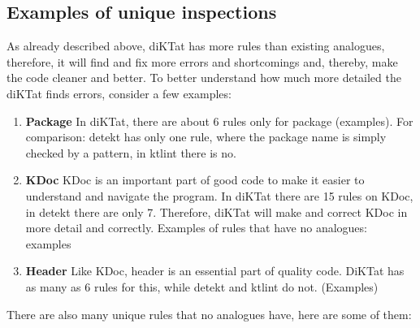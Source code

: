 \subsection{Examples of unique inspections}
\par
As already described above, diKTat has more rules than existing analogues, therefore, it will find and fix more errors and shortcomings and, thereby, make the code cleaner and better. To better understand how much more detailed the diKTat finds errors, consider a few examples:

\begin{enumerate}
    \item \textbf{Package}
In diKTat, there are about 6 rules only for package (examples). For comparison: detekt has only one rule, where the package name is simply checked by a pattern, in ktlint there is no.
    \item \textbf{KDoc}
KDoc is an important part of good code to make it easier to understand and navigate the program. In diKTat there are 15 rules on KDoc, in detekt there are only 7. Therefore, diKTat will make and correct KDoc in more detail and correctly. Examples of rules that have no analogues: examples
    \item \textbf{Header} 
Like KDoc, header is an essential part of quality code. DiKTat has as many as 6 rules for this, while detekt and ktlint do not. (Examples) 
\end{enumerate}

There are also many unique rules that no analogues have, here are some of them:

